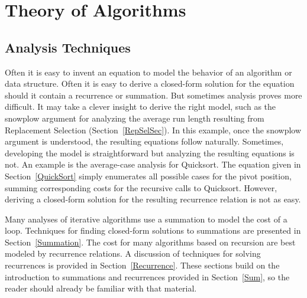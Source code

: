 
\part{Theory of Algorithms}
\label{PartTheoryAlgs}
\mycleardoublepage

\chapter{Analysis Techniques}
\label{AnalTech}
\def\CHHEAD{Chap.\ \thechapter\ Analysis Techniques}    %


Often it is easy to invent an equation to model the behavior of an
algorithm or data structure.
Often it is easy to derive a closed-form solution for the equation
should it contain a recurrence or summation.
But sometimes analysis proves more difficult.
It may take a clever insight to derive the right model, such as the
snowplow argument for analyzing the average run length resulting from
Replacement Selection
(Section~\ref{RepSelSec}).
In this example, once the snowplow argument is understood,
the resulting equations follow naturally.
Sometimes, developing the model is straightforward but analyzing
the resulting equations is not.
An example is the average-case analysis for
Quicksort.
The equation given in Section~\ref{QuickSort} simply enumerates all
possible cases for the pivot position, summing corresponding costs for
the recursive calls to Quicksort.
However, deriving a closed-form solution for the resulting recurrence
relation is not as easy.

Many analyses of iterative algorithms use a summation to model
the cost of a loop.
Techniques for finding closed-form solutions to summations are
presented in Section~\ref{Summation}.
The cost for many algorithms based on recursion are best
modeled by recurrence relations.
A discussion of techniques for solving
recurrences is provided in Section~\ref{Recurrence}.
These sections build on the introduction to summations and
recurrences provided in Section~\ref{Sum}, so the reader should
already be familiar with that material.

